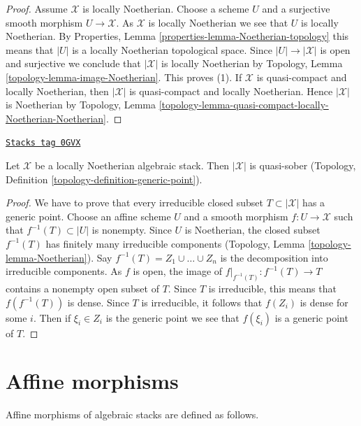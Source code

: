 \begin{proof}
Assume $\mathcal{X}$ is locally Noetherian.
Choose a scheme $U$ and a surjective smooth morphism
$U \to \mathcal{X}$. As $\mathcal{X}$ is locally Noetherian
we see that $U$ is locally Noetherian. By
Properties, Lemma \ref{properties-lemma-Noetherian-topology}
this means that $|U|$ is a locally Noetherian topological space.
Since $|U| \to |\mathcal{X}|$ is open and surjective we conclude that
$|\mathcal{X}|$ is locally Noetherian by
Topology, Lemma \ref{topology-lemma-image-Noetherian}.
This proves (1). If $\mathcal{X}$ is quasi-compact and locally Noetherian,
then $|\mathcal{X}|$ is quasi-compact and locally Noetherian. Hence
$|\mathcal{X}|$ is Noetherian by Topology, Lemma
\ref{topology-lemma-quasi-compact-locally-Noetherian-Noetherian}.
\end{proof}

\begin{lemma}
\label{stacks-morphisms-lemma-locally-Noetherian-quasi-sober}
\href{https://stacks.math.columbia.edu/tag/0GVX}{\texttt{Stacks tag 0GVX}}

Let $\mathcal{X}$ be a locally Noetherian algebraic stack.
Then $|\mathcal{X}|$ is quasi-sober (Topology, Definition
\ref{topology-definition-generic-point}).
\end{lemma}

\begin{proof}
We have to prove that every
irreducible closed subset $T \subset |\mathcal{X}|$ has a generic point.
Choose an affine scheme $U$ and a smooth morphism $f : U \to \mathcal{X}$
such that $f^{-1}(T) \subset |U|$ is nonempty. Since $U$ is Noetherian,
the closed subset $f^{-1}(T)$ has finitely many irreducible components
(Topology, Lemma \ref{topology-lemma-Noetherian}).
Say $f^{-1}(T) = Z_1 \cup \ldots \cup Z_n$ is the decomposition into
irreducible components. As $f$ is open, the image of
$f|_{f^{-1}(T)} : f^{-1}(T) \to T$ contains a nonempty open subset of $T$.
Since $T$ is irreducible, this means that $f(f^{-1}(T))$ is dense.
Since $T$ is irreducible, it follows that $f(Z_i)$ is dense for some $i$.
Then if $\xi_i \in Z_i$ is the generic point we see that
$f(\xi_i)$ is a generic point of $T$.
\end{proof}

\section{Affine morphisms}
\label{stacks-morphisms-section-affine}
Affine morphisms of algebraic stacks are defined as follows.

